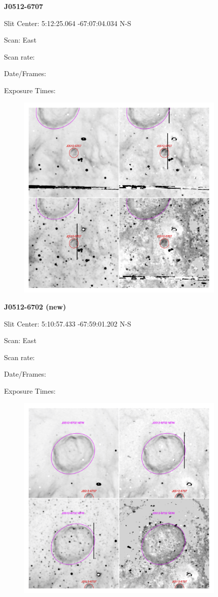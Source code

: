 \documentclass[11pt]{article}
\begin{document}
\newpage
{\bf J0512-6707}  
 
Slit Center:   5:12:25.064  -67:07:04.034    N-S 

Scan:  East

Scan rate:  

Date/Frames:

Exposure Times:  

\begin{figure}
\includegraphics[width=10.05cm]{snapshots/J0512-6707.png}
\end{figure}

\newpage
{\bf J0512-6702 (new)}  
 
Slit Center:   5:10:57.433   -67:59:01.202    N-S 

Scan:  East

Scan rate:  

Date/Frames:

Exposure Times:  

\begin{figure}
\includegraphics[width=10.05cm]{snapshots/J0512-6702.png}
\end{figure}
\end{document}
